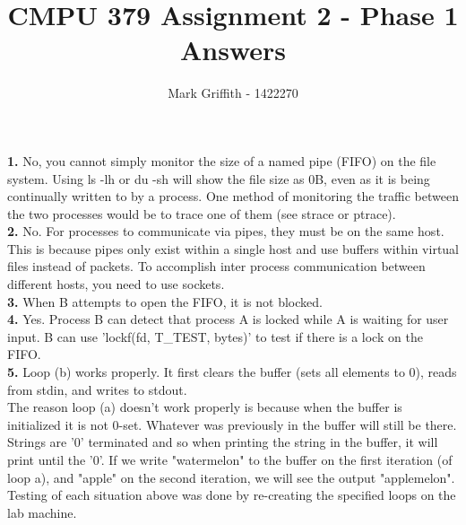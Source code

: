 \documentclass{article}
\begin{document}
\title{CMPU 379 Assignment 2 - Phase 1 Answers}
\author{Mark Griffith - 1422270}

\maketitle

\noindent
\textbf{1.} No, you cannot simply monitor the size
of a named pipe (FIFO) on the file system. Using
ls -lh or du -sh will show the file size as 0B,
even as it is being continually written to by
a process. One method of monitoring the traffic
between the two processes would be to trace one
of them (see strace or ptrace). \\

\noindent
\textbf{2.} No. For processes to communicate via
pipes, they must be on the same host. This
is because pipes only exist within a single
host and use buffers within virtual files
instead of packets. To accomplish inter
process communication between different hosts,
you need to use sockets. \\

\noindent
\textbf{3.} When B attempts to open the FIFO,
it is not blocked. \\

\noindent
\textbf{4.} Yes. Process B can detect that
process A is locked while A is waiting for
user input. B can use 'lockf(fd, T\_TEST, bytes)'
to test if there is a lock on the FIFO. \\

\noindent
\textbf{5.}
Loop (b) works properly. It first clears the buffer (sets all
elements to 0), reads from stdin, and writes to stdout. \\

\noindent
The reason loop (a) doesn't work properly is because when the
buffer is initialized it is not 0-set. Whatever was
previously in the buffer will still be there. Strings are
'0' terminated and so when printing the string in the
buffer, it will print until the '0'. If we write
"watermelon" to the buffer on the first iteration (of loop a),
and "apple"
on the second iteration, we will see the output "applemelon". \\

\noindent
Testing of each situation above was done by re-creating the
specified loops on the lab machine.
\end{document}
